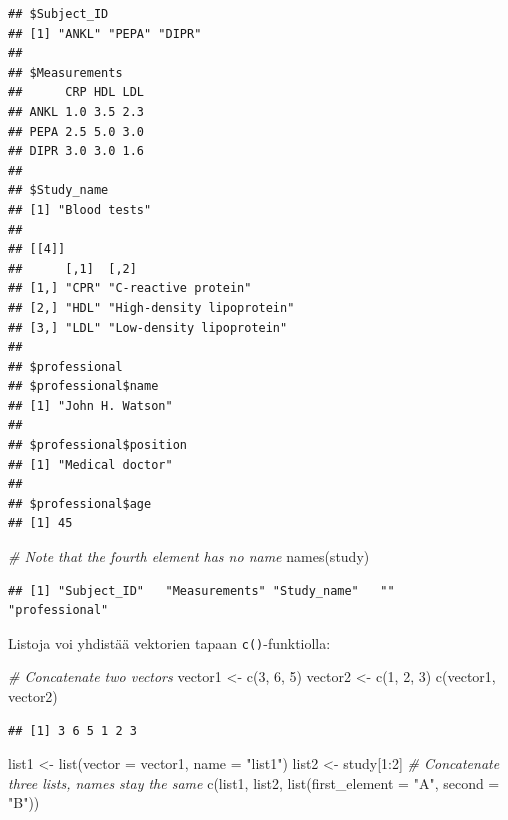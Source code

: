 \documentclass[
]{book}
\newenvironment{Shaded}{\begin{snugshade}}{\end{snugshade}}
\newcommand{\AttributeTok}[1]{\textcolor[rgb]{0.77,0.63,0.00}{#1}}
\newcommand{\CommentTok}[1]{\textcolor[rgb]{0.56,0.35,0.01}{\textit{#1}}}
\newcommand{\DecValTok}[1]{\textcolor[rgb]{0.00,0.00,0.81}{#1}}
\newcommand{\FunctionTok}[1]{\textcolor[rgb]{0.00,0.00,0.00}{#1}}
\newcommand{\NormalTok}[1]{#1}
\newcommand{\OtherTok}[1]{\textcolor[rgb]{0.56,0.35,0.01}{#1}}
\newcommand{\SpecialCharTok}[1]{\textcolor[rgb]{0.00,0.00,0.00}{#1}}
\newcommand{\StringTok}[1]{\textcolor[rgb]{0.31,0.60,0.02}{#1}}
\begin{document}
\begin{verbatim}
## $Subject_ID
## [1] "ANKL" "PEPA" "DIPR"
## 
## $Measurements
##      CRP HDL LDL
## ANKL 1.0 3.5 2.3
## PEPA 2.5 5.0 3.0
## DIPR 3.0 3.0 1.6
## 
## $Study_name
## [1] "Blood tests"
## 
## [[4]]
##      [,1]  [,2]                      
## [1,] "CPR" "C-reactive protein"      
## [2,] "HDL" "High-density lipoprotein"
## [3,] "LDL" "Low-density lipoprotein" 
## 
## $professional
## $professional$name
## [1] "John H. Watson"
## 
## $professional$position
## [1] "Medical doctor"
## 
## $professional$age
## [1] 45
\end{verbatim}

\begin{Shaded}
\begin{Highlighting}[]
\CommentTok{\# Note that the fourth element has no name}
\FunctionTok{names}\NormalTok{(study)}
\end{Highlighting}
\end{Shaded}

\begin{verbatim}
## [1] "Subject_ID"   "Measurements" "Study_name"   ""             "professional"
\end{verbatim}

Listoja voi yhdistää vektorien tapaan \texttt{c()}-funktiolla:

\begin{Shaded}
\begin{Highlighting}[]
\CommentTok{\# Concatenate two vectors}
\NormalTok{vector1 }\OtherTok{\textless{}{-}} \FunctionTok{c}\NormalTok{(}\DecValTok{3}\NormalTok{, }\DecValTok{6}\NormalTok{, }\DecValTok{5}\NormalTok{)}
\NormalTok{vector2 }\OtherTok{\textless{}{-}} \FunctionTok{c}\NormalTok{(}\DecValTok{1}\NormalTok{, }\DecValTok{2}\NormalTok{, }\DecValTok{3}\NormalTok{)}
\FunctionTok{c}\NormalTok{(vector1, vector2)}
\end{Highlighting}
\end{Shaded}

\begin{verbatim}
## [1] 3 6 5 1 2 3
\end{verbatim}

\begin{Shaded}
\begin{Highlighting}[]
\NormalTok{list1 }\OtherTok{\textless{}{-}} \FunctionTok{list}\NormalTok{(}\AttributeTok{vector =}\NormalTok{ vector1,}
              \AttributeTok{name =} \StringTok{"list1"}\NormalTok{)}
\NormalTok{list2 }\OtherTok{\textless{}{-}}\NormalTok{ study[}\DecValTok{1}\SpecialCharTok{:}\DecValTok{2}\NormalTok{]}
\CommentTok{\# Concatenate three lists, names stay the same}
\FunctionTok{c}\NormalTok{(list1, list2, }\FunctionTok{list}\NormalTok{(}\AttributeTok{first\_element =} \StringTok{"A"}\NormalTok{, }\AttributeTok{second =} \StringTok{"B"}\NormalTok{))}
\end{Highlighting}
\end{Shaded}
\end{document}
